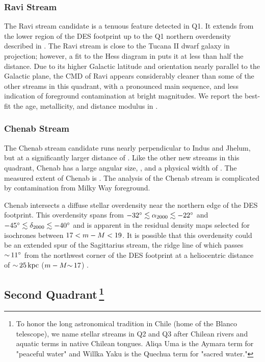 \documentclass[twocolumn]{aastex61}
\begin{document}
\subsubsection{Ravi Stream}
\label{sec:ravi}

The Ravi stream candidate is a tenuous feature detected in Q1.
It extends from the lower region of the DES footprint up to the Q1 northern overdensity described in .
The Ravi stream is close to the Tucana II dwarf galaxy in projection; however, a fit to the Hess diagram in  puts it at less than half the distance.
Due to its higher Galactic latitude and orientation nearly parallel to the Galactic plane, the CMD of Ravi appears considerably cleaner than some of the other streams in this quadrant, with a pronounced main sequence, and less indication of foreground contamination at bright magnitudes.
We report the best-fit the age, metallicity, and distance modulus in .


\subsubsection{Chenab Stream}
\label{sec:chenab}

The Chenab stream candidate runs nearly perpendicular to Indus and Jhelum, but at a significantly larger distance of .
Like the other new streams in this quadrant, Chenab has a large angular size, , and a physical width of \CHECK{$\sigma = 493 \pc$}.
The measured extent of Chenab is . 
The analysis of the Chenab stream is complicated by contamination from Milky Way foreground.

Chenab intersects a diffuse stellar overdensity near the northern edge of the DES footprint.
This overdensity spans from $-32{}^{\circ} \lesssim {\ensuremath{\alpha_{2000}}} \lesssim -22{}^{\circ}$ and $-45{}^{\circ} \lesssim {\ensuremath{\delta_{2000}}} \lesssim -40{}^{\circ}$ and is apparent in the residual density maps selected for isochrones between $17 < m - M < 19$.
It is possible that this overdensity could be an extended spur of the Sagittarius stream, the ridge line of which passes $ {\sim}\, 11{}^{\circ}$ from the northwest corner of the DES footprint at a heliocentric distance of $ {\sim}\, 25 \mathrm{\,kpc}$ ($m - M  {\sim}\, 17$) \citep{Majewski:2004, Law:2005}.

\subsection{Second Quadrant\,\footnote{To honor the long astronomical tradition in Chile (home of the Blanco telescope), we name stellar streams in Q2 and Q3 after Chilean rivers and aquatic terms in native Chilean tongues. Aliqa Uma is the Aymara term for "peaceful water" and Willka Yaku is the Quechua term for "sacred water."}}
\end{document}

